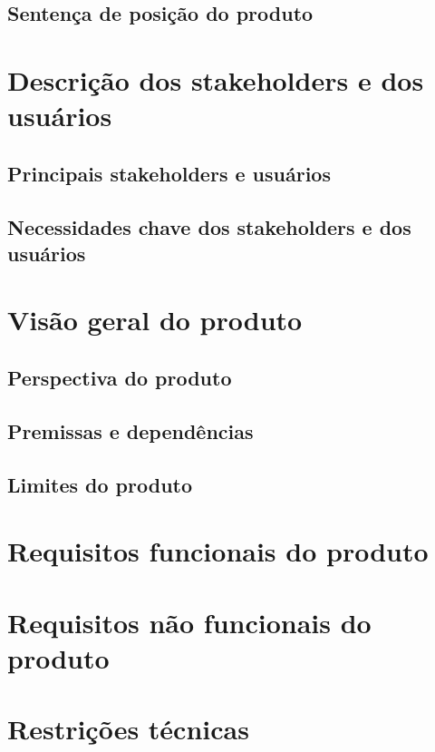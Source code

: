 \documentclass[12pt, a4paper]{article}
\begin{document}
    \subsection{Sentença de posição do produto}

    \section{Descrição dos stakeholders e dos usuários}
    \subsection{Principais stakeholders e usuários}
    \subsection{Necessidades chave dos stakeholders e dos usuários}

    \section{Visão geral do produto}
    \subsection{Perspectiva do produto}
    \subsection{Premissas e dependências}
    \subsection{Limites do produto}

    \section{Requisitos funcionais do produto}

    \section{Requisitos não funcionais do produto}

    \section{Restrições técnicas}
\end{document}
